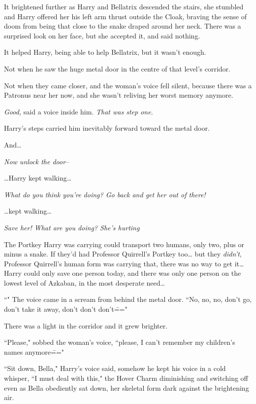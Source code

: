 It brightened further as Harry and Bellatrix descended the stairs, she stumbled and Harry offered her his left arm thrust outside the Cloak, braving the sense of doom from being that close to the snake draped around her neck. There was a surprised look on her face, but she accepted it, and said nothing.

It helped Harry, being able to help Bellatrix, but it wasn't enough.

Not when he saw the huge metal door in the centre of that level's corridor.

Not when they came closer, and the woman's voice fell silent, because there was a Patronus near her now, and she wasn't reliving her worst memory anymore.

\emph{Good,} said a voice inside him. \emph{That was step one.}

Harry's steps carried him inevitably forward toward the metal door.

And{\ldots}

\emph{Now unlock the door\---}

{\ldots}Harry kept walking{\ldots}

\emph{What do you think you're doing? Go back and get her out of there!}

{\ldots}kept walking{\ldots}

\emph{Save her! What are you doing? She's hurting }

The Portkey Harry was carrying could transport two humans, only two, plus or minus a snake. If they'd had Professor Quirrell's Portkey too{\ldots} but they \emph{didn't}, Professor Quirrell's human form was carrying that, there was no way to get it{\ldots} Harry could only save one person today, and there was only one person on the lowest level of Azkaban, in the most desperate need{\ldots}

``" The voice came in a scream from behind the metal door. ``No, no, no, don't go, don't take it away, don't don't don't\==="

There was a light in the corridor and it grew brighter.

``Please," sobbed the woman's voice, ``please, I can't remember my children's names anymore\==="

``Sit down, Bella," Harry's voice said, somehow he kept his voice in a cold whisper, ``I must deal with this," the Hover Charm diminishing and switching off even as Bella obediently sat down, her skeletal form dark against the brightening air.

